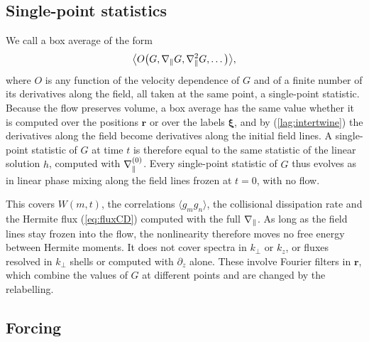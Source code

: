 \subsection{Single-point statistics}\label{fr:single}

We call a box average of the form
\begin{equation}\label{lag:Odef}
  \big\langle O\big(G,\nabla_\parallel G,\nabla_\parallel^2G,\dots\big)\big\rangle ,
\end{equation}
where $O$ is any function of the velocity dependence of $G$ and of a finite number of its derivatives along the field, all taken at the same point, a single-point statistic. Because the flow preserves volume, a box average has the same value whether it is computed over the positions $\boldsymbol r$ or over the labels $\boldsymbol\xi$, and by (\ref{lag:intertwine}) the derivatives along the field become derivatives along the initial field lines. A single-point statistic of $G$ at time $t$ is therefore equal to the same statistic of the linear solution $h$, computed with $\nabla_\parallel^{(0)}$. Every single-point statistic of $G$ thus evolves as in linear phase mixing along the field lines frozen at $t=0$, with no flow.

This covers $W(m,t)$, the correlations $\langle g_mg_n\rangle$, the collisional dissipation rate and the Hermite flux (\ref{eq:fluxCD}) computed with the full $\nabla_\parallel$. As long as the field lines stay frozen into the flow, the nonlinearity therefore moves no free energy between Hermite moments. It does not cover spectra in $k_\perp$ or $k_z$, or fluxes resolved in $k_\perp$ shells or computed with $\partial_z$ alone. These involve Fourier filters in $\boldsymbol r$, which combine the values of $G$ at different points and are changed by the relabelling.

\subsection{Forcing}\label{fr:forcing}

